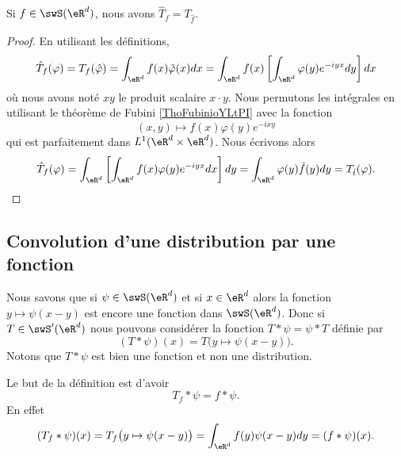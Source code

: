 \begin{lemma}
    Si \( f\in \swS(\eR^d)\), nous avons \( \hat T_f=T_{\hat f}\).
\end{lemma}

\begin{proof}
    En utilisant les définitions,
    \begin{equation}
        \hat T_f(\varphi)=T_f(\hat \varphi)=\int_{\eR^d}f(x)\hat \varphi(x)dx=\int_{\eR^d}f(x)\left[ \int_{\eR^d}\varphi(y) e^{-iyx}dy \right]dx
    \end{equation}
    où nous avons noté \( xy\) le produit scalaire \( x\cdot y\). Nous permutons les intégrales en utilisant le théorème de Fubini \ref{ThoFubinioYLtPI} avec la fonction
    \begin{equation}
        (x,y)\mapsto f(x)\varphi(y) e^{-ixy}
    \end{equation}
    qui est parfaitement dans \( L^1(\eR^d\times \eR^d)\). Nous écrivons alors
    \begin{equation}
        \hat T_f(\varphi)=\int_{\eR^d}\left[ \int_{\eR^d}f(x)\varphi(y) e^{-iyx}dx \right]dy=\int_{\eR^d}\varphi(y)\hat f(y)dy=T_{\hat t}(\varphi).
    \end{equation}
\end{proof}

\subsection{Convolution d'une distribution par une fonction}

Nous savons que si \( \psi\in\swS(\eR^d)\) et si \( x\in\eR^d\) alors la fonction \( y\mapsto\psi(x-y)\) est encore une fonction dans \( \swS(\eR^d)\). Donc si \( T\in\swS'(\eR^d)\) nous pouvons considérer la fonction \( T*\psi=\psi*T\) définie par
\begin{equation}
    (T*\psi)(x)=T\big( y\mapsto\psi(x-y) \big).
\end{equation}
Notons que \( T*\psi\) est bien une fonction et non une distribution.

Le but de la définition est d'avoir
\begin{equation}
    T_f*\psi=f*\psi.
\end{equation}
En effet
\begin{equation}
    (T_f*\psi)(x)=T_f\big( y\mapsto \psi(x-y) \big)=\int_{\eR^d}f(y)\psi(x-y)dy=(f*\psi)(x).
\end{equation}

